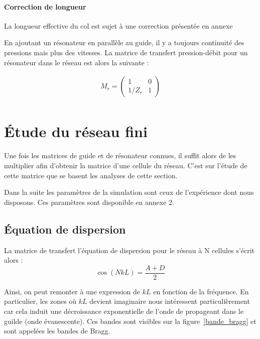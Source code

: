 \paragraph{Correction de longueur}
La longueur effective du col est sujet à une correction présentée en annexe 

En ajoutant un résonateur en parallèle au guide, il y a toujours continuité des pressions mais plus des vitesses. La matrice de transfert pression-débit pour un résonateur dans le réseau est alors la suivante :

\begin{eqnarray*}
M_{r} = \begin{pmatrix} 1 &  0 \\ 1 /Z_{r} & 1  \end{pmatrix}\\
\end{eqnarray*}

\section{Étude du réseau fini}

Une fois les matrices de guide et de résonateur connues, il suffit alors de les multiplier afin d'obtenir la matrice d'une cellule du réseau. C'est sur l'étude de cette matrice que se basent les analyses de cette section. 

Dans la suite les paramètres de la simulation sont ceux de l'expérience dont nous disposons. Ces paramètres sont disponible en annexe 2.

\subsection{Équation de dispersion}
La matrice de transfert l'équation de dispersion pour le réseau à N cellules s'écrit alors : 
\begin{equation}
\cos(NkL) = \frac{A+D}{2} 
\end{equation}

Ainsi, on peut remonter à une expression de $kL$ en fonction de la fréquence. En particulier, les zones où $kL$ devient imaginaire nous intéressent particulièrement car cela induit une décroissance exponentielle de l'onde de propageant dans le guilde (onde évanescente). Ces bandes sont visibles sur la figure~\ref{bande_bragg} et sont appelées les bandes de Bragg.


